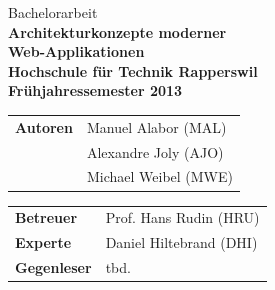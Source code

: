 \begin{titlepage}

	\thispagestyle{empty}
	\BgThispage

	\sffamily\color{titlepagefontcolor}
	\begin{center}
		\Large
		Bachelorarbeit\\[5mm]
	   
		\Huge\bfseries
		Architekturkonzepte moderner\\
		Web-Applikationen\\[15mm]

		\large\normalfont\sffamily
		Hochschule für Technik Rapperswil\\[1mm]
		Frühjahressemester 2013
	\end{center}
	\vfill

	\begin{multicols}{2}
		\begin{tabularx}{\textwidth}{l X}
			\bfseries Autoren & Manuel Alabor (MAL)\tabularnewline
			& Alexandre Joly (AJO)\tabularnewline
			& Michael Weibel (MWE)\tabularnewline
		\end{tabularx}

		\begin{tabularx}{\textwidth}{l X}
			\bfseries Betreuer & Prof. Hans Rudin (HRU)\tabularnewline
			\bfseries Experte & Daniel Hiltebrand (DHI)\tabularnewline
			\bfseries Gegenleser & tbd.\tabularnewline
		\end{tabularx}
	\end{multicols}

\end{titlepage}

\restoregeometry